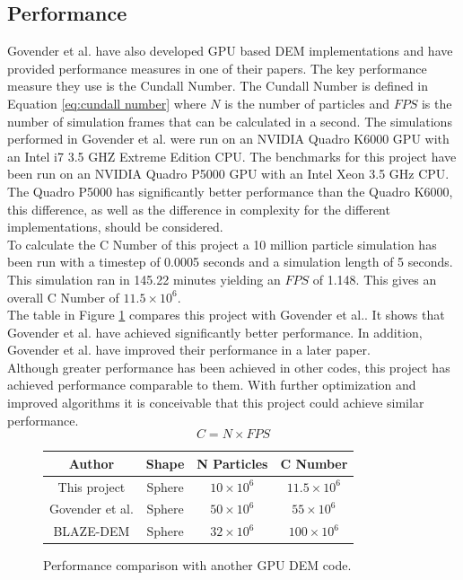 \documentclass[10pt,a4paper,titlepage]{report}
\begin{document}
\subsection{Performance}
Govender et al. have also developed GPU based DEM implementations and have provided performance measures in one of their papers\cite{performance}. The key performance measure they use is the Cundall Number. The Cundall Number is defined in Equation \ref{eq:cundall number} where $N$ is the number of particles and $FPS$ is the number of simulation frames that can be calculated in a second. The simulations performed in Govender et al.\cite{performance} were run on an NVIDIA Quadro K6000 GPU with an Intel i7 3.5 GHZ Extreme Edition CPU. The benchmarks for this project have been run on an NVIDIA Quadro P5000 GPU with an  Intel Xeon 3.5 GHz CPU. The Quadro P5000 has significantly better performance than the Quadro K6000, this difference, as well as the difference in complexity for the different implementations, should be considered.
\\To calculate the C Number of this project a 10 million particle simulation has been run with a timestep of 0.0005 seconds and a simulation length of 5 seconds. This simulation ran in 145.22 minutes yielding an $FPS$ of 1.148. This gives an overall C Number of $11.5 \times 10^6$.
\\The table in Figure \ref{fig:performance comparison} compares this project with Govender et al.\cite{performance}. It shows that Govender et al. have achieved significantly better performance. In addition, Govender et al. have improved their performance in a later paper\cite{blazedem}.
\\Although greater performance has been achieved in other codes, this project has achieved performance comparable to them. With further optimization and improved algorithms it is conceivable that this project could achieve similar performance.
\begin{equation}
C = N \times FPS
\label{eq:cundall number}
\end{equation}

\begin{figure}
\begin{center}
\begin{tabular}{|c c c c|}
\hline
Author & Shape & N Particles & C Number\\
\hline
This project & Sphere & $10 \times 10^6$ & $11.5 \times 10^6$ \\
Govender et al.\cite{performance} & Sphere & $50 \times 10^6$ & $55 \times 10^6$ \\
BLAZE-DEM\cite{blazedem} & Sphere & $32 \times 10^6$ & $100 \times 10^6$ \\
\hline
\end{tabular}
\end{center}
\caption{Performance comparison with another GPU DEM code.}
\label{fig:performance comparison}
\end{figure}
\end{document}
